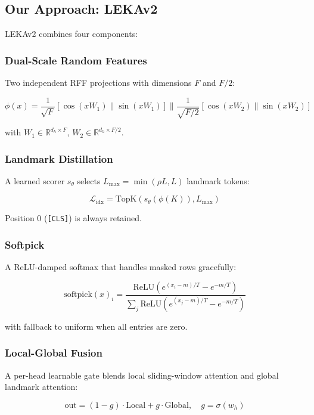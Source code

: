 \subsection{Our Approach: LEKAv2}

LEKAv2 combines four components:

\subsubsection{Dual-Scale Random Features}

Two independent RFF projections with dimensions $F$ and $F/2$:

\[
\phi(x) = \frac{1}{\sqrt{F}} [\cos(x W_1) \| \sin(x W_1)] 
\| \frac{1}{\sqrt{F/2}} [\cos(x W_2) \| \sin(x W_2)]
\tag{1.2}
\]

with $W_1 \in \mathbb{R}^{d_h \times F}$, $W_2 \in \mathbb{R}^{d_h \times F/2}$.

\subsubsection{Landmark Distillation}

A learned scorer $s_\theta$ selects $L_\text{max} = \min(\rho L, L)$ 
landmark tokens:

\[
\mathcal{L}_\text{idx} = \text{TopK}(s_\theta(\phi(K)), L_\text{max})
\tag{1.3}
\]

Position 0 (\texttt{[CLS]}) is always retained.

\subsubsection{Softpick}

A ReLU-damped softmax that handles masked rows gracefully:

\[
\text{softpick}(x)_i = \frac{\text{ReLU}(e^{(x_i - m)/T} - e^{-m/T})}{\sum_j \text{ReLU}(e^{(x_j - m)/T} - e^{-m/T})}
\tag{1.4}
\]

with fallback to uniform when all entries are zero.

\subsubsection{Local-Global Fusion}

A per-head learnable gate blends local sliding-window attention and 
global landmark attention:

\[
\text{out} = (1 - g) \cdot \text{Local} + g \cdot \text{Global}, \quad g = \sigma(w_h)
\tag{1.5}
\]

